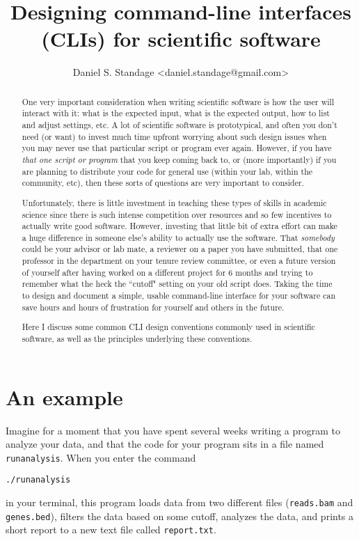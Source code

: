 \documentclass{article}
\begin{document}
\title{Designing command-line interfaces (CLIs) for scientific software}
\author{Daniel S. Standage \textless daniel.standage@gmail.com\textgreater}
\maketitle

\begin{abstract}
One very important consideration when writing scientific software is how the user will interact with it: what is the expected input, what is the expected output, how to list and adjust settings, etc. A lot of scientific software is prototypical, and often you don't need (or want) to invest much time upfront worrying about such design issues when you may never use that particular script or program ever again. However, if you have \textit{that one script or program} that you keep coming back to, or (more importantly) if you are planning to distribute your code for general use (within your lab, within the community, etc), then these sorts of questions are very important to consider.

Unfortunately, there is little investment in teaching these types of skills in academic science since there is such intense competition over resources and so few incentives to actually write good software. However, investing that little bit of extra effort can make a huge difference in someone else's ability to actually use the software. That \textit{somebody} could be your advisor or lab mate, a reviewer on a paper you have submitted, that one professor in the department on your tenure review committee, or even a future version of yourself after having worked on a different project for 6 months and trying to remember what the heck the ``cutoff" setting on your old script does. Taking the time to design and document a simple, usable command-line interface for your software can save hours and hours of frustration for yourself and others in the future.

Here I discuss some common CLI design conventions commonly used in scientific software, as well as the principles underlying these conventions.
\end{abstract}

\tableofcontents
\clearpage

\section{An example}
Imagine for a moment that you have spent several weeks writing a program to analyze your data, and that the code for your program sits in a file named \texttt{runanalysis}.
When you enter the command
\begin{verbatim}
./runanalysis
\end{verbatim}
in your terminal, this program loads data from two different files (\texttt{reads.bam} and \texttt{genes.bed}), filters the data based on some cutoff, analyzes the data, and prints a short report to a new text file called \texttt{report.txt}.
\end{document}
